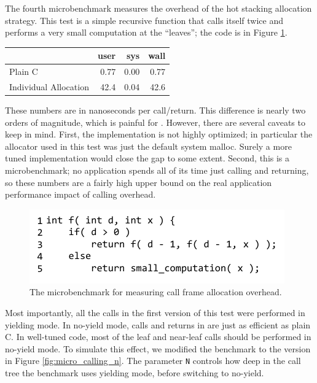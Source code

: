 \documentclass[9pt,preprint]{sigplanconf-2}
\begin{document}
The fourth microbenchmark measures the overhead of the hot stacking allocation strategy.
This test is a simple recursive function that calls itself twice and performs a very small computation at the ``leaves''; the code is in Figure \ref{fig:micro_calling}.

\vspace{1em}
\begin{tabular}{|l|r|r|r|}
  \hline
   & user & sys & wall \\
  \hline
  \hline
  Plain C & 0.77 & 0.00 & 0.77 \\
  \hline
  Individual Allocation & 42.4 & 0.04 & 42.6 \\
  \hline
\end{tabular}
\vspace{1em}

These numbers are in nanoseconds per call/return.
This difference is nearly two orders of magnitude, which is painful for \charcoal{}.
However, there are several caveats to keep in mind.
First, the \charcoal{} implementation is not highly optimized; in particular the allocator used in this test was just the default system malloc.
Surely a more tuned implementation would close the gap to some extent.
Second, this is a microbenchmark; no application spends all of its time just calling and returning, so these numbers are a fairly high upper bound on the real application performance impact of calling overhead.

\begin{figure}
\includegraphics{just_calling_benchmark}
\caption{The microbenchmark for measuring call frame allocation overhead.}
\label{fig:micro_calling}
\end{figure}

Most importantly, all the calls in the first version of this test were performed in yielding mode.
In no-yield mode, calls and returns in \charcoal{} are just as efficient as plain C.
In well-tuned \charcoal{} code, most of the leaf and near-leaf calls should be performed in no-yield mode.
To simulate this effect, we modified the benchmark to the version in Figure \ref{fig:micro_calling_n}.
The parameter \texttt{N} controls how deep in the call tree the benchmark uses yielding mode, before switching to no-yield.
\end{document}
